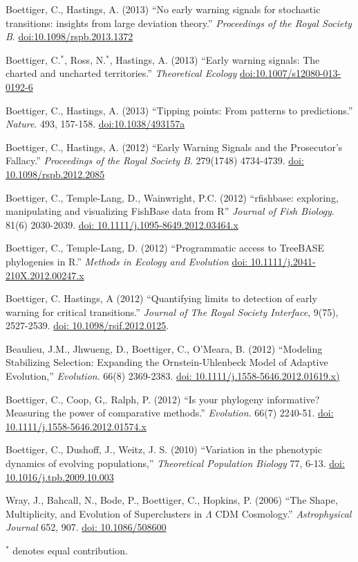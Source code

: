 \documentclass[margin]{res}
\begin{document}
\begin{resume}
\begin{etaremune}[start = 16]
\item  Boettiger, C., Hastings, A. (2013) ``No early warning signals for stochastic transitions: insights from large deviation theory.'' {\it Proceedings of the Royal Society B}. \href{http://doi.org/10.1098/rspb.2013.1372}{doi:10.1098/rspb.2013.1372}
\item  Boettiger, C.$^*$, Ross, N.$^*$, Hastings, A. (2013) ``Early warning signals: The charted and uncharted territories.'' {\it Theoretical Ecology} \href{http://doi.org/10.1007/s12080-013-0192-6}{doi:10.1007/s12080-013-0192-6}
\item  Boettiger, C., Hastings, A. (2013) ``Tipping points: From patterns to predictions.'' {\it Nature}. 493, 157-158. \href{http://dx.doi.org/10.1038/493157a}{doi:10.1038/493157a}
\item Boettiger, C., Hastings, A. (2012) ``Early Warning Signals and the Prosecutor's Fallacy.'' {\it Proceedings of the Royal Society B}. 279(1748) 4734-4739.   \href{http://dx.doi.org/10.1098/rspb.2012.2085}{doi: 10.1098/rspb.2012.2085}
\item Boettiger, C., Temple-Lang, D., Wainwright, P.C. (2012) ``rfishbase: exploring, manipulating and visualizing FishBase data from R'' {\it Journal of Fish Biology}. 81(6) 2030-2039. \href{http://dx.doi.org/10.1111/j.1095-8649.2012.03464.x}{doi: 10.1111/j.1095-8649.2012.03464.x}
\item Boettiger, C., Temple-Lang, D. (2012)  ``Programmatic access to TreeBASE phylogenies in R.'' {\it Methods in Ecology and Evolution}  \href{http://dx.doi.org/10.1111/j.2041-210X.2012.00247.x}{doi: 10.1111/j.2041-210X.2012.00247.x}
\item Boettiger, C. Hastings, A (2012) ``Quantifying limits to detection of early warning for critical transitions.'' {\it Journal of The Royal Society Interface},  9(75), 2527-2539. \href{http://dx.doi.org/10.1098/rsif.2012.0125}{doi: 10.1098/rsif.2012.0125}.
\item Beaulieu, J.M., Jhwueng, D., Boettiger, C., O'Meara, B. (2012) ``Modeling Stabilizing Selection: Expanding the Ornstein-Uhlenbeck Model of Adaptive Evolution,'' {\it Evolution}. 66(8) 2369-2383. \href{http://dx.doi.org/10.1111/j.1558-5646.2012.01619.x}{doi: 10.1111/j.1558-5646.2012.01619.x)}
\item Boettiger, C., Coop, G,. Ralph, P. (2012) ``Is your phylogeny informative? Measuring the power of comparative methods.'' {\it Evolution}. 66(7) 2240-51. \href{http://dx.doi.org/10.1111/j.1558-5646.2012.01574.x}{doi: 10.1111/j.1558-5646.2012.01574.x}
\item Boettiger, C., Dushoff, J., Weitz, J. S. (2010) ``Variation in the phenotypic dynamics of evolving populations,'' {\it Theoretical Population Biology} 77, 6-13. \href{http://dx.doi.org/10.1016/j.tpb.2009.10.003}{doi: 10.1016/j.tpb.2009.10.003}
\item Wray, J., Bahcall, N., Bode, P., Boettiger, C., Hopkins, P.  (2006)  ``The Shape, Multiplicity, and Evolution of Superclusters in $\Lambda$ CDM Cosmology.''  {\it Astrophysical Journal} 652, 907. \href{http://dx.doi.org/10.1086/508600}{doi: 10.1086/508600}
\end{etaremune}
{ \footnotesize $^*$ denotes equal contribution.}



\end{resume}
\end{document}
